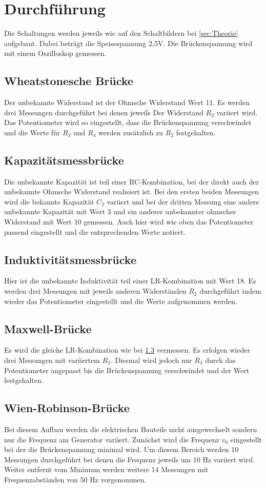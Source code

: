 \section{Durchführung}
\label{sec:Durchführung}

Die Schaltungen werden jeweils wie auf den Schaltbildern bei 
\ref{sec:Theorie} aufgebaut. Dabei beträgt die
Speisespannung 2,5V. Die Brückenspannung wird
mit einem Oszilloskop gemessen.
\subsection{Wheatstonesche Brücke}
Der unbekannte Widerstand ist der Ohmsche Widerstand Wert 11.
Es werden drei Messungen durchgeführt bei denen jeweils Der Widerstand $R_2$
variiert wird. Das Potentiometer wird so eingestellt,
dass die Brückenspannung verschwindet und die Werte
für $R_3$ und $R_4$ werden zusätzlich zu $R_2$ festgehalten.
\subsection{Kapazitätsmessbrücke}
Die unbekannte Kapazität ist teil einer RC-Kombination,
bei der direkt auch der unbekannte Ohmsche Widerstand realisiert ist.
Bei den ersten beiden Messungen wird die bekannte Kapazität $C_2$ variiert
und bei der dritten Messung eine andere unbekannte Kapazität mit Wert 3
und ein anderer unbekannter ohmscher Widerstand mit Wert 10 gemessen.
Auch hier wird wie oben das Potentiometer passend eingestellt und die
entsprechenden Werte notiert.
\subsection{Induktivitätsmessbrücke}
\label{sec:Indu}
Hier ist die unbekannte Induktivität teil einer LR-Kombination
mit Wert 18. Es werden drei Messungen mit jeweils anderen Widerständen $R_2$
durchgeführt indem wieder das Potentiometer eingestellt und die Werte aufgenommen werden.
\subsection{Maxwell-Brücke}
Es wird die gleiche LR-Kombination wie bei \ref{sec:Indu} vermessen.
Es erfolgen wieder drei Messungen mit variiertem $R_2$. Diesmal
wird jedoch nur $R_3$ durch das Potentiometer angepasst bis die
Brückenspannung verschwindet und der Wert festgehalten.

\subsection{Wien-Robinson-Brücke}
Bei diesem Aufbau werden die elektrischen Bauteile
nicht ausgewechselt sondern nur die Frequenz am 
Generator variiert. Zunächst wird die Frequenz $v_0$ eingestellt
bei der die Brückenspannung minimal wird. Um diesem Bereich werden
10 Messungen durchgeführt bei denen die Frequenz jeweils um 10 Hz
variiert wird. Weiter entfernt vom Minimum werden weitere 14 Messungen
mit Frequenzabständen von 50 Hz vorgenommen.

